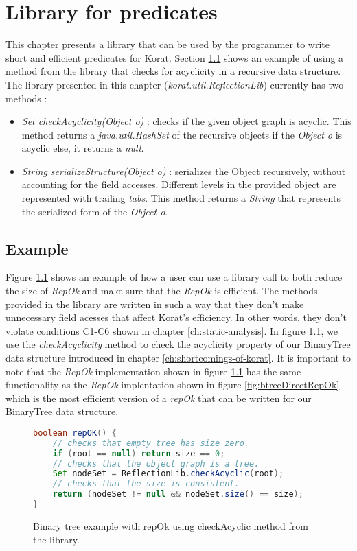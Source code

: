 \chapter{Library for predicates}
\label{ch:library-for-predicates}
This chapter presents a library that can be used by the programmer
to write short and efficient predicates for Korat. Section
\ref{sec:library-for-predicates-example} shows an example of using a
method from the library that checks for acyclicity in a recursive data
structure. The library presented in this chapter
(\emph{korat.util.ReflectionLib}) currently has two methods :
\begin{itemize}
\item \emph{Set checkAcyclicity(Object o)} : checks if the given
  object graph is acyclic. This method returns a
  \emph{java.util.HashSet} of the recursive objects if the
  \emph{Object o} is acyclic else, it returns a \emph{null}.
\item \emph{String serializeStructure(Object o)} : serializes the
  Object recursively, without accounting for the field
  accesses. Different levels in the provided object are represented
  with trailing \emph{tabs}. This method returns a \emph{String} that
  represents the serialized form of the \emph{Object o}.
\end{itemize}

\section{Example}
\label{sec:library-for-predicates-example}
Figure \ref{fig:btreeLibraryRepOk} shows an example of how a user can
use a library call to both reduce the size of \emph{RepOk} and make
sure that the \emph{RepOk} is efficient. The methods provided in the
library are written in such a way that they don't make unnecessary
field acesses that affect Korat's efficiency. In other words, they
don't violate conditions C1-C6 shown in chapter
\ref{ch:static-analysis}. In figure \ref{fig:btreeLibraryRepOk}, we
use the \emph{checkAcyclicity} method to check the acyclicity property
of our BinaryTree data structure introduced in chapter
\ref{ch:shortcomings-of-korat}. It is important to note that the
\emph{RepOk} implementation shown in figure
\ref{fig:btreeLibraryRepOk} has the same functionality as the
\emph{RepOk} implentation shown in figure \ref{fig:btreeDirectRepOk}
which is the most efficient version of a \emph{repOk} that can be
written for our BinaryTree data structure.

\begin{figure}
\centering
\begin{lstlisting}[language=Java]
boolean repOK() {
    // checks that empty tree has size zero.
    if (root == null) return size == 0;
    // checks that the object graph is a tree.
    Set nodeSet = ReflectionLib.checkAcyclic(root);
    // checks that the size is consistent.
    return (nodeSet != null && nodeSet.size() == size);
}
\end{lstlisting}
\caption{Binary tree example with repOk using checkAcyclic method from the library.}
\label{fig:btreeLibraryRepOk}
\end{figure}
